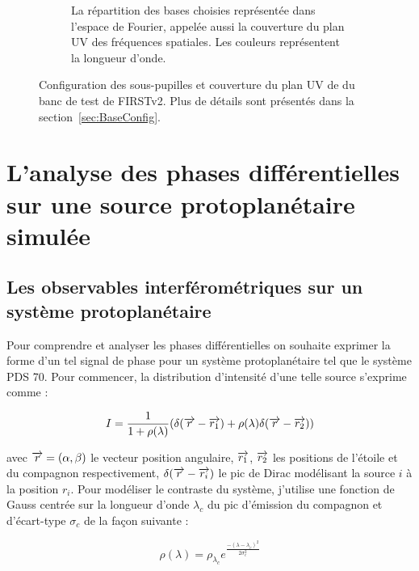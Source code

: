 \begin{figure}[ht!]
\begin{subfigure}{0.6\textwidth}
        \caption{La répartition des bases choisies représentée dans l'espace de Fourier, appelée aussi la couverture du plan UV des fréquences spatiales. Les couleurs représentent la longueur d'onde.}
        \label{fig:SegUVSimuleRappelB}
    \end{subfigure}
    \caption[Configuration des sous-pupilles et couverture du plan UV du banc de test de FIRSTv2.]{Configuration des sous-pupilles et couverture du plan UV de du banc de test de FIRSTv2. Plus de détails sont présentés dans la section~\ref{sec:BaseConfig}.}
    \label{fig:SegUVSimuleRappel}
\end{figure}


\section{L'analyse des phases différentielles sur une source protoplanétaire simulée}
\label{sec:PhaseDiffAnalyse}

\subsection{Les observables interférométriques sur un système protoplanétaire}

Pour comprendre et analyser les phases différentielles on souhaite exprimer la forme d'un tel signal de phase pour un système protoplanétaire tel que le système PDS 70. Pour commencer, la distribution d'intensité d'une telle source s'exprime comme :

\begin{equation}
    I = \frac{1}{1 + \rho(\lambda)} (\delta(\overrightarrow{r} - \overrightarrow{r_1}) + \rho(\lambda) \delta(\overrightarrow{r} - \overrightarrow{r_2}))
\end{equation}

avec $\overrightarrow{r} = (\alpha, \beta)$ le vecteur position angulaire, $\overrightarrow{r_1}$, $\overrightarrow{r_2}$ les positions de l'étoile et du compagnon respectivement, $\delta(\overrightarrow{r} - \overrightarrow{r_i})$ le pic de Dirac modélisant la source $i$ à la position $r_i$. Pour modéliser le contraste du système, j'utilise une fonction de Gauss centrée sur la longueur d'onde $\lambda_c$ du pic d'émission du compagnon et d'écart-type $\sigma_c$ de la façon suivante : 

\begin{equation}
    \rho(\lambda) = \rho_{\lambda_c} e^{\frac{-(\lambda - \lambda_c)^2}{2 \sigma_{c}^2}}
\end{equation}

